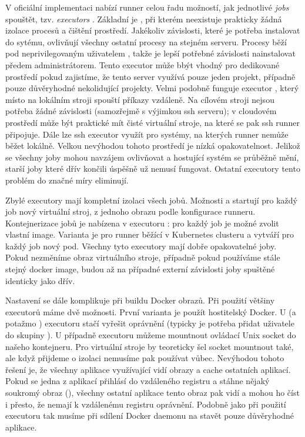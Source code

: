         V oficiální implementaci nabízí runner celou řadu možností, jak jednotlivé \textit{jobs} spouštět, tzv. \textit{executors} \cite{gitlab-runner-config}. Základní je , při kterém neexistuje prakticky žádná izolace procesů a čištění prostředí. Jakékoliv závislosti, které je potřeba instalovat do sytému, ovlivňují všechny ostatní procesy na stejném serveru. Procesy běží pod neprivilegovaným uživatelem , takže je lepší potřebné závislosti nainstalovat předem administrátorem. Tento executor může bbýt vhodný pro dedikované prostředí pokud zajistíme, že tento server využívá pouze jeden projekt, případně pouze důvěryhodné nekolidující projekty. Velmi podobně funguje executor , který místo na lokálním stroji spouští příkazy vzdáleně. Na cílovém stroji nejsou potřeba žádné závislosti (samozřejmě s výjimkou ssh serveru); v cloudovém prostředí může být praktické mít čisté virtuální stroje, na které se pak ssh runner připojuje. Dále lze ssh executor využít pro systémy, na kterých runner nemůže běžet lokálně. Velkou nevýhodou tohoto prostředí je nízká opakovatelnost. Jelikož se všechny joby mohou navzájem ovlivňovat a hostující systém se průběžně mění, starší joby které dřív končili úspěšně už nemusí fungovat. Ostatní executory tento problém do značné míry eliminují.

        Zbylé executory mají kompletní izolaci všech jobů. Možnosti  a  startují pro každý job nový virtuální stroj, z jednoho obrazu podle konfigurace runneru. Kontejnerizace jobů je nabízena v executoru : pro každý job je možné zvolit vlastní image. Varianta  je pro runner běžící v Kubernetes clusteru a vytváří pro každý job nový pod. Všechny tyto executory mají dobře opakovatelné joby. Pokud nezměníme obraz virtuálního stroje, případně pokud používáme stále stejný docker image, budou až na případné externí závislosti joby spuštěné identicky jako dřív.

        Nastavení \CI se dále komplikuje při buildu Docker obrazů. Při použití většiny executorů máme dvě možnosti. První varianta je použít hostitelský Docker. U  (a potažmo ) executoru stačí vyřešit oprávnění (typicky je potřeba přidat uživatele  do skupiny ). U  případně  executoru můžeme mountnout ovládací Unix socket  do našeho kontejneru. Pro virtuální stroje by teoreticky šel socket mountnout také, ale když přijdeme o izolaci nemusíme pak  používat vůbec. Nevýhodou tohoto řešení je, že všechny aplikace využívající \CI vidí obrazy a cache ostatních aplikací. Pokud se jedna z aplikací přihlásí do vzdáleného registru a stáhne nějaký soukromý obraz (), všechny ostatní aplikace tento obraz pak vidí a mohou ho číst i přesto, že nemají k vzdálenému registru oprávnění. Podobně jako při použití  executoru tak musíme při sdílení Docker daemonu na \CI stavět pouze důvěryhodné aplikace.


